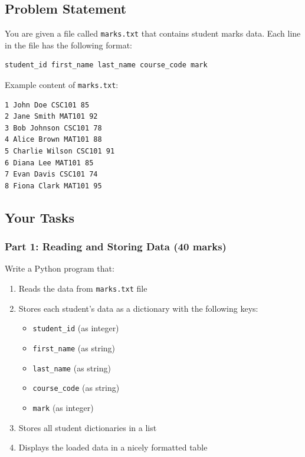 \documentclass[a4paper,11pt]{article}
\theoremstyle{mytheor}
\begin{document}
\subsection*{Problem Statement}

You are given a file called \texttt{marks.txt} that contains student marks data. Each line in the file has the following format:

\begin{verbatim}
student_id first_name last_name course_code mark
\end{verbatim}

Example content of \texttt{marks.txt}:
\begin{verbatim}
1 John Doe CSC101 85
2 Jane Smith MAT101 92
3 Bob Johnson CSC101 78
4 Alice Brown MAT101 88
5 Charlie Wilson CSC101 91
6 Diana Lee MAT101 85
7 Evan Davis CSC101 74
8 Fiona Clark MAT101 95
\end{verbatim}

\subsection*{Your Tasks}

\subsubsection*{Part 1: Reading and Storing Data (40 marks)}

Write a Python program that:

\begin{enumerate}
    \item Reads the data from \texttt{marks.txt} file
    \item Stores each student's data as a dictionary with the following keys:
    \begin{itemize}
        \item \texttt{student\_id} (as integer)
        \item \texttt{first\_name} (as string)
        \item \texttt{last\_name} (as string)
        \item \texttt{course\_code} (as string)
        \item \texttt{mark} (as integer)
    \end{itemize}
    \item Stores all student dictionaries in a list
    \item Displays the loaded data in a nicely formatted table
\end{enumerate}
\end{document}
